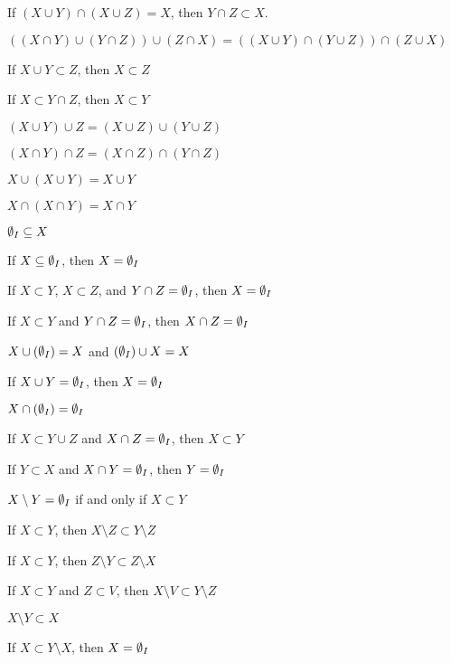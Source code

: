 \documentclass{article}
\begin{document}
\begin{thm}
\item\label{pboole:35} If $(X\cup Y)\cap(X\cup Z)=X$,
  then $Y\cap Z\subset X$.
\item\label{pboole:36} $((X \cap Y) \cup (Y \cap Z)) \cup (Z \cap X) = ((X \cup Y) \cap (Y \cup Z)) \cap (Z \cup X)$
\item\label{pboole:37} If $X \cup Y \subset Z$, then $X \subset Z$
\item\label{pboole:38} If $X \subset Y \cap Z$, then $X \subset Y$
\item\label{pboole:39} $(X \cup Y) \cup Z = (X \cup Z) \cup (Y \cup Z)$
\item\label{pboole:40} $(X \cap Y) \cap Z = (X \cap Z) \cap (Y \cap Z)$
\item\label{pboole:41} $X \cup (X \cup Y) = X \cup Y$
\item\label{pboole:42} $ X \cap (X \cap Y) = X \cap Y$
\item\label{pboole:43} $\emptyset_{I}\subseteq X$
\item\label{pboole:44} If $X\subseteq\emptyset_{I}$, then $X=\emptyset_{I}$
\item\label{pboole:45} If $X \subset Y$, $X \subset Z$, and $Y \cap Z = \emptyset_{I}$,
  then $X = \emptyset_{I}$
\item\label{pboole:46} If $X \subset Y$ and $Y \cap Z = \emptyset_{I}$,
  then $X \cap Z = \emptyset_{I}$
\item\label{pboole:47} $X \cup (\emptyset_{I}) = X$ and
  $(\emptyset_{I}) \cup X = X$
\item\label{pboole:48} If $X \cup Y = \emptyset_{I}$, then
  $X = \emptyset_{I}$
\item\label{pboole:49} $X \cap (\emptyset_{I}) = \emptyset_{I}$
\item\label{pboole:50} If $X \subset Y \cup Z$ and $X \cap Z = \emptyset_{I}$, then
  $X \subset Y$
\item\label{pboole:51} If $Y \subset X$ and $X \cap Y = \emptyset_{I}$, then
  $Y = \emptyset_{I}$
\item\label{pboole:52} $X \setminus Y = \emptyset_{I}$ if and only if $X \subset Y$
\item\label{pboole:53} If $X \subset Y$, then $X \setminus Z \subset Y \setminus Z$
\item\label{pboole:54} If $X \subset Y$, then $Z \setminus Y \subset Z \setminus X$
\item\label{pboole:55} If $X \subset Y$ and $Z \subset V$, then $X \setminus V \subset Y \setminus Z$
\item\label{pboole:56} $X \setminus Y \subset X$
\item\label{pboole:57} If $X \subset Y \setminus X$, then $X = \emptyset_{I}$

\end{thm}
\end{document}
